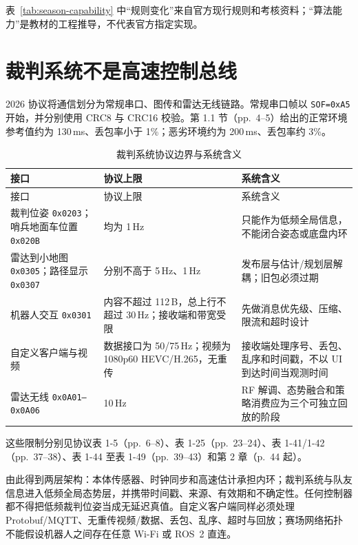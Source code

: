 表~\ref{tab:season-capability} 中“规则变化”来自官方现行规则和考核资料\cite{rmuc2026_rules_v220,rmuc2026_assessment_full,rmuc2026_assessment_details}；“算法能力”是教材的工程推导，不代表官方指定实现。

\section{裁判系统不是高速控制总线}

2026 协议将通信划分为常规串口、图传和雷达无线链路。常规串口帧以 \texttt{SOF=0xA5} 开始，并分别使用 CRC8 与 CRC16 校验。第 1.1 节（pp.~4--5）给出的正常环境参考值约为 130\,ms、丢包率小于 1\%；恶劣环境约为 200\,ms、丢包率约 3\%\cite{rmuc2026_protocol_v200}。

\begin{longtable}{p{}p{}p{}}
\caption{裁判系统协议边界与系统含义}\label{tab:referee-boundary}\\
\toprule
接口 & 协议上限 & 系统含义 \\
\midrule
\endfirsthead
\toprule
接口 & 协议上限 & 系统含义 \\
\midrule
\endhead
裁判位姿 \texttt{0x0203}；哨兵地面车位置 \texttt{0x020B} & 均为 1\,Hz & 只能作为低频全局信息，不能闭合姿态或底盘内环 \\
雷达到小地图 \texttt{0x0305}；路径显示 \texttt{0x0307} & 分别不高于 5\,Hz、1\,Hz & 发布层与估计/规划层解耦；旧包必须过期 \\
机器人交互 \texttt{0x0301} & 内容不超过 112\,B，总上行不超过 30\,Hz；接收端和带宽受限 & 先做消息优先级、压缩、限流和超时设计 \\
自定义客户端与视频 & 数据接口为 50/75\,Hz；视频为 1080p60 HEVC/H.265，无重传 & 接收端处理序号、丢包、乱序和时间戳，不以 UI 到达时间当观测时间 \\
雷达无线 \texttt{0x0A01--0x0A06} & 10\,Hz & RF 解调、态势融合和策略消费应为三个可独立回放的阶段 \\
\bottomrule
\end{longtable}

这些限制分别见协议表 1-5（pp.~6--8）、表 1-25（pp.~23--24）、表 1-41/1-42（pp.~37--38）、表 1-44 至表 1-49（pp.~39--43）和第 2 章（p.~44 起）。

由此得到两层架构：本体传感器、时钟同步和高速估计承担内环；裁判系统与队友信息进入低频全局态势层，并携带时间戳、来源、有效期和不确定性。任何控制器都不得把低频裁判位姿当成无延迟真值。自定义客户端同样必须处理 Protobuf/MQTT、无重传视频/数据、丢包、乱序、超时与回放；赛场网络拓扑不能假设机器人之间存在任意 Wi-Fi 或 ROS~2 直连。

